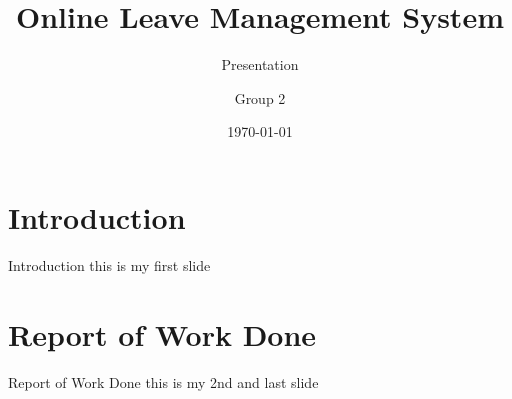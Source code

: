 \documentclass[default]{beamer}
\title[OLM]{Online Leave Management System}
\subtitle{Presentation}
\date{\today}
\author[Group 2]{Group 2}
\institute[MEC]{Govt. Model Engineering College,Thrikakkara}
\begin{document}
		
	\frame{\maketitle}	
	
	\section{Introduction}
		\begin{frame}{Introduction}
		this is my first slide
		\end{frame}
	
	\section{Report of Work Done}
		\begin{frame}{Report of Work Done}
		this is my 2nd and last slide
		\end{frame}
\end{document}
